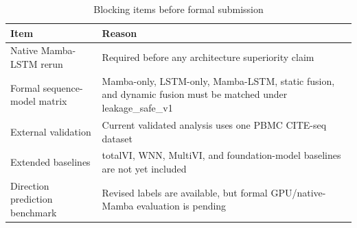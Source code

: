 \documentclass[11pt]{article}
\begin{document}
\begin{table}[H]
\centering
\caption{Blocking items before formal submission}
\label{tab:S7_blocking}
\small
\begin{tabularx}{\textwidth}{lX}
\toprule
\textbf{Item} & \textbf{Reason} \\
\midrule
Native Mamba-LSTM rerun & Required before any architecture superiority claim \\
Formal sequence-model matrix & Mamba-only, LSTM-only, Mamba-LSTM, static fusion, and dynamic fusion must be matched under leakage\_safe\_v1 \\
External validation & Current validated analysis uses one PBMC CITE-seq dataset \\
Extended baselines & totalVI, WNN, MultiVI, and foundation-model baselines are not yet included \\
Direction prediction benchmark & Revised labels are available, but formal GPU/native-Mamba evaluation is pending \\
\bottomrule
\end{tabularx}
\end{table}



\end{document}
